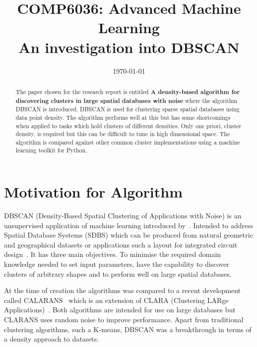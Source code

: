 \documentclass{ecsarticle}     %
\begin{document}
\frontmatter
\title      {COMP6036: Advanced Machine Learning\\
            An investigation into DBSCAN}
      
\addresses  {\deptname\\\univname}

\date       {\today}
\subject    {}
\keywords   {}
\maketitle


\begin{abstract}
The paper chosen for the research report is entitled \textbf{A density-based algorithm for discovering clusters in large spatial databases with noise} where the algorithm DBSCAN is introduced.
DBSCAN is used for clustering sparse spatial databases using data point density.
The algorithm performs well at this but has some shortcomings when applied to tasks which hold clusters of different densities.
Only one priori, cluster density, is required but this can be difficult to tune in high dimensional space.
The algorithm is compared against other common cluster implementations using a machine learning toolkit for Python.
\end{abstract}

\mainmatter


\section{Motivation for Algorithm}

DBSCAN (Density-Based Spatial Clustering of Applications with Noise) is an unsupervised application of machine learning introduced by~\cite{ester96dbscan}.
Intended to address Spatial Database Systems (SDBS) which can be produced from natural geometric and geographical datasets or applications such a layout for integrated circuit design~\citep{guting94sdbs}.
It has three main objectives.
To minimise the required domain knowledge needed to set input parameters, have the capability to discover clusters of arbitrary shapes and to perform well on large spatial databases.

At the time of creation the algorithms was compared to a recent development called CALARANS~\citep{ng94clarans} which is an extension of CLARA (Clustering LARge Applications)~\citep{kaufman90clara}.
Both algorithms are intended for use on large databases but CLARANS uses random noise to improve performance.
Apart from traditional clustering algorithms, such a K-means, DBSCAN was a breakthrough in terms of a density approach to datasets.
\end{document}

